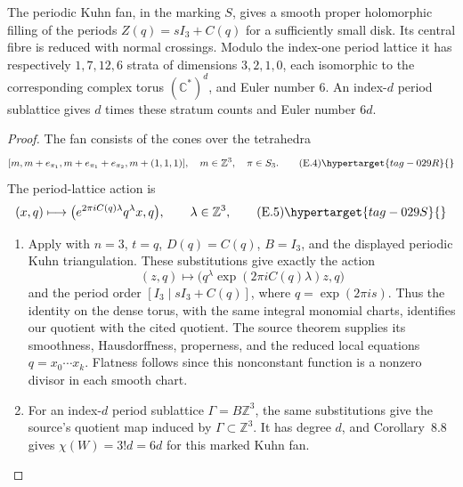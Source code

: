 \begin{theorem}\hypertarget{tag-02R0}{}\label{night:P1.9}
The periodic Kuhn fan, in the marking $S$, gives a smooth proper
holomorphic filling of the periods $Z(q)=sI_3+C(q)$ for a sufficiently
small disk.  Its central fibre is reduced with normal crossings.
Modulo the index-one period lattice it has respectively $1,7,12,6$
strata of dimensions $3,2,1,0$, each isomorphic to the corresponding
complex torus $(\mathbb C^*)^d$, and Euler number $6$.
An index-$d$ period sublattice gives $d$ times these stratum counts and
Euler number $6d$.
\end{theorem}
\begin{proof}
The fan consists of the cones over the tetrahedra
\[
 [m,m+e_{\pi_1},m+e_{\pi_1}+e_{\pi_2},m+(1,1,1)],
 \quad m\in\mathbb Z^3,\quad\pi\in S_3.
 \tag{E.4}\hypertarget{tag-029R}{}\label{maps:eq:E.4}
\]
The period-lattice action is
\[
 (x,q)\longmapsto
 \bigl(e^{2\pi iC(q)\lambda}q^\lambda x,q\bigr),
 \qquad\lambda\in\mathbb Z^3,
 \tag{E.5}\hypertarget{tag-029S}{}\label{maps:eq:E.5}
\]

\begin{enumerate}[label={$\langle1\rangle$\arabic*.}]
\item Apply \cite[Theorem~8.7 and Corollary~8.8, arXiv v1, pp.~57--59]{Yang2026}
with $n=3$, $t=q$, $D(q)=C(q)$, $B=I_3$, and the displayed
periodic Kuhn triangulation.  These substitutions give exactly the
action
\[
 (z,q)\longmapsto
 \bigl(q^\lambda\exp(2\pi iC(q)\lambda)z,q\bigr)
\]
and the period order $[I_3\mid sI_3+C(q)]$, where
$q=\exp(2\pi i s)$.  Thus the identity on the dense torus, with
the same integral monomial charts, identifies our quotient with
the cited quotient.  The source theorem supplies its smoothness,
Hausdorffness, properness, and the reduced local equations
$q=x_0\cdots x_k$.  Flatness follows since this nonconstant
function is a nonzero divisor in each smooth chart.
\item For an index-$d$ period sublattice $\Gamma=B\mathbb Z^3$,
the same substitutions give the source's quotient map induced
by $\Gamma\subset\mathbb Z^3$.  It has degree $d$, and
Corollary~8.8 gives $\chi(W)=3!d=6d$ for this marked Kuhn fan.
\end{enumerate}
\end{proof}


